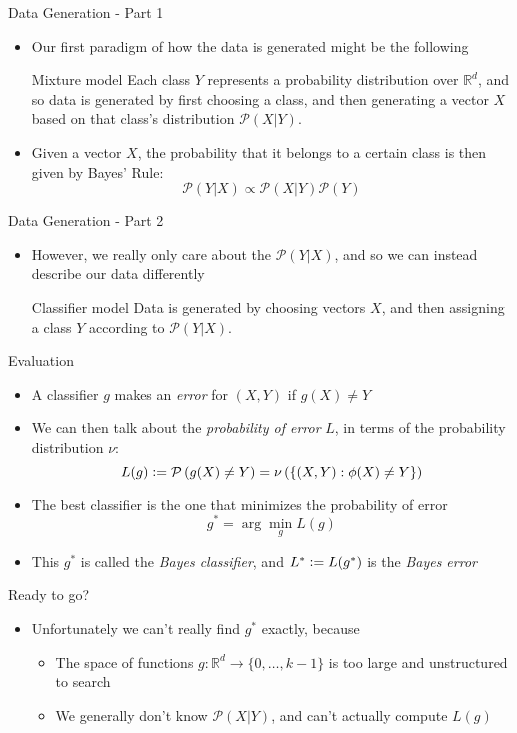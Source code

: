 \documentclass{beamer}
\renewcommand{\Pr}[1]{\mathcal{P} \left( #1 \right)}
\newcommand{\R}{\mathbb{R}}
\newcommand{\defeq}{\vcentcolon=}
\newcommand{\pa}[1]{\left( #1 \right)}
\newcommand{\br}[1]{\left\{ #1 \right\} }
\begin{document}
\begin{frame}{Data Generation - Part 1}
\begin{itemize}
\item Our first paradigm of how the data is generated might be the following
\begin{block}{Mixture model}
Each class $Y$ represents a probability distribution over $\R^d$, and so data is generated by first choosing a class, and then generating a vector $X$ based on that class's distribution $\Pr{X|Y}$.\\
\end{block}
\item Given a vector $X$, the probability that it belongs to a certain class is then given by Bayes' Rule:
\[ \Pr{Y|X} \propto \Pr{X|Y} \Pr{Y} \]
\end{itemize}
\end{frame}

\begin{frame}{Data Generation - Part 2}
\begin{itemize}
\item However, we really only care about the $\Pr{Y|X}$, and so we can instead describe our data differently
\begin{block}{Classifier model}
Data is generated by choosing vectors $X$, and then assigning a class $Y$ according to $\Pr{Y|X}$. 

\end{block}
\end{itemize}
\end{frame}

\begin{frame}{Evaluation}
\begin{itemize}
\item A classifier $g$ makes an \emph{error} for $(X,Y)$ if $g(X) \ne Y$
\item We can then talk about the \emph{probability of error} $L$, in terms of the probability distribution $\nu$:
\[ L(g) \defeq \Pr{g(X) \ne Y} = \nu\pa{ \br{ (X,Y) : \phi(X) \ne Y}}  \]
\item The best classifier is the one that minimizes the probability of error
\[ g^* = \arg \min_g L(g) \]
\item This $g^*$ is called the \emph{Bayes classifier}, and $L^* \defeq L(g^*)$ is the \emph{Bayes error}
\end{itemize}
\end{frame}

\begin{frame}{Ready to go?}
\begin{itemize}
\item Unfortunately we can't really find $g^*$ exactly, because
\begin{itemize}
\item The space of functions $g: \R^d \to \{0,\ldots,k-1\}$ is too large and unstructured to search
\item We generally don't know $\Pr{X|Y}$, and can't actually compute $L(g)$
\end{itemize}
\end{itemize}
\end{frame}
\end{document}
